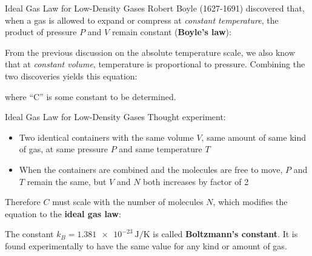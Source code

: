 \documentclass[12pt,aspectratio=169,dvipsnames]{beamer}
\begin{document}
%
%




\begin{frame}{Ideal Gas Law for Low-Density Gases}
  Robert Boyle (1627-1691) discovered that, when a gas is allowed to expand or
  compress at \emph{constant temperature}, the product of pressure $P$ and $V$
  remain constant (\textbf{Boyle's law}):


  \vspace{-.15in}From the previous discussion on the absolute temperature scale,
  we also know that at \emph{constant volume}, temperature is proportional to
  pressure. Combining the two discoveries yields this equation:


  \vspace{-.15in}where ``C'' is some constant to be determined.
\end{frame}



\begin{frame}{Ideal Gas Law for Low-Density Gases}
  Thought experiment:
  \begin{itemize}
  \item Two identical containers with the same volume $V$, same amount of same
    kind of gas, at same pressure $P$ and same temperature $T$
  \item When the containers are combined and the molecules are free to move,
    $P$ and $T$ remain the same, but $V$ and $N$ both increases by factor of 2
  \end{itemize}
  Therefore $C$ must scale with the number of molecules $N$, which
  modifies the equation to the \textbf{ideal gas law}:


  The constant $k_B=\SI{1.381e-23}{\joule\per\kelvin}$ is called
  \textbf{Boltzmann's constant}. It is found experimentally to have the same
  value for any kind or amount of gas.
\end{frame}
\end{document}
